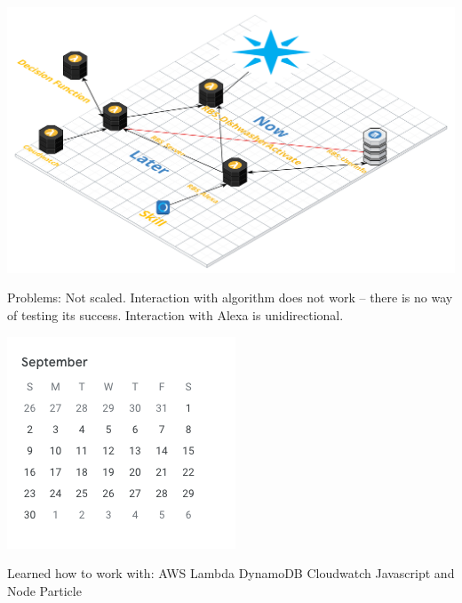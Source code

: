 \documentclass{beamer}
\begin{document}
\begin{frame}
    \includegraphics[width=\paperwidth,height=0.5\paperheight,keepaspectratio]{pictures/architecture}
    \begin{outline}
        Problems:
         Not scaled.
         Interaction with algorithm does not work -- there is no way of testing
        its success.
         Interaction with Alexa is unidirectional.
    \end{outline}
\end{frame}

\begin{frame}
    \includegraphics[width=0.5\paperwidth,height=0.5\paperheight,keepaspectratio]{pictures/september}

    \begin{outline}
         Learned how to work with:
         AWS
         Lambda
         DynamoDB
         Cloudwatch
         Javascript and Node
         Particle
    \end{outline}
\end{frame}
\end{document}

